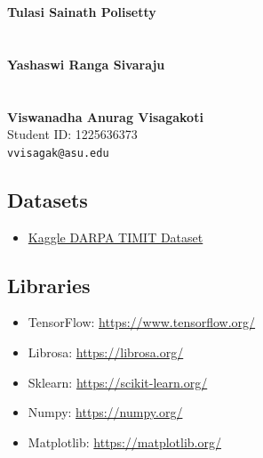 \documentclass[12pt]{article}
\begin{document}
\newcommand{\authorThreeID}{Student ID: 1225636373}
\newcommand{\authorThreeEmail}{\texttt{vvisagak@asu.edu}}

\noindent\textbf{Tulasi Sainath Polisetty}\\
\authorOneID\\
\authorOneEmail\\[1ex]

\noindent\textbf{Yashaswi Ranga Sivaraju}\\
\authorTwoID\\
\authorTwoEmail\\[2ex]

\noindent\textbf{Viswanadha Anurag Visagakoti}\\
\authorThreeID\\
\authorThreeEmail\\[3ex]



\subsection{Datasets}
\begin{itemize}
    \item \href{https://www.kaggle.com/datasets/mfekadu/darpa-timit-acousticphonetic-continuous-speech}{Kaggle DARPA TIMIT Dataset}   
\end{itemize}

\subsection{Libraries}
\begin{itemize}
    \item TensorFlow: \url{https://www.tensorflow.org/}
    \item Librosa: \url{https://librosa.org/}
    \item Sklearn: \url{https://scikit-learn.org/}
    \item Numpy: \url{https://numpy.org/}
    \item Matplotlib: \url{https://matplotlib.org/}

\end{itemize}


% 
% 
\end{document}
